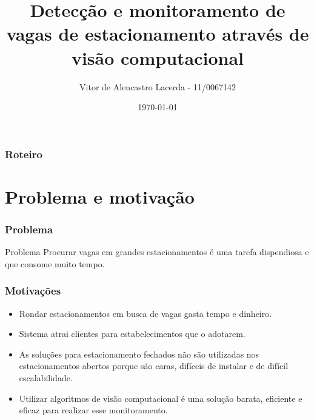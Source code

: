 \documentclass{beamer}
\title[Seminario TG1]{Detecção e monitoramento de vagas de estacionamento através de visão computacional}
\author{Vitor de Alencastro Lacerda - 11/0067142}
\institute[UnB]{
    Universidade de Brasília
    \medskip
}
\date{\today}
\begin{document}
\begin{frame}
\titlepage
\end{frame}

\begin{frame}
\frametitle{Roteiro} %
\tableofcontents %
\end{frame}




\section{Problema e motivação}

\begin{frame}
\frametitle{Problema}

\begin{block}{Problema}
    Procurar vagas em grandes estacionamentos é uma tarefa dispendiosa e que consome muito tempo.
\end{block}
\end{frame}

\begin{frame}
 \frametitle{Motivações}
 \begin{itemize}
   \item Rondar estacionamentos em busca de vagas gasta tempo e dinheiro.
   \item Sistema atrai clientes para estabelecimentos que o adotarem. 
   \item  As soluções para estacionamento fechados não são utilizadas nos estacionamentos abertos porque são caras, difíceis de instalar e de difícil escalabilidade.
   \item  Utilizar algoritmos de visão computacional é uma solução barata, eficiente e eficaz para realizar esse monitoramento.
     
 \end{itemize}
\end{frame}
\end{document}
